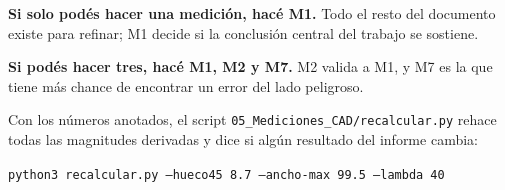 \documentclass[11pt,a4paper]{article}
\theoremstyle{definition}
\begin{document}
\vspace{0.5cm}

\begin{tcolorbox}[colback=black!5,colframe=black!65,boxrule=0.7pt,arc=1pt]
\textbf{Si solo podés hacer una medición, hacé M1.} Todo el resto del documento existe
para refinar; M1 decide si la conclusión central del trabajo se sostiene.

\smallskip
\textbf{Si podés hacer tres, hacé M1, M2 y M7.} M2 valida a M1, y M7 es la que tiene más
chance de encontrar un error del lado peligroso.
\end{tcolorbox}

\vspace{0.4cm}

\noindent
\footnotesize
Con los números anotados, el script \texttt{05\_Mediciones\_CAD/recalcular.py} rehace
todas las magnitudes derivadas y dice si algún resultado del informe cambia:

\begin{center}
\texttt{python3 recalcular.py --hueco45 8.7 --ancho-max 99.5 --lambda 40}
\end{center}
\end{document}
